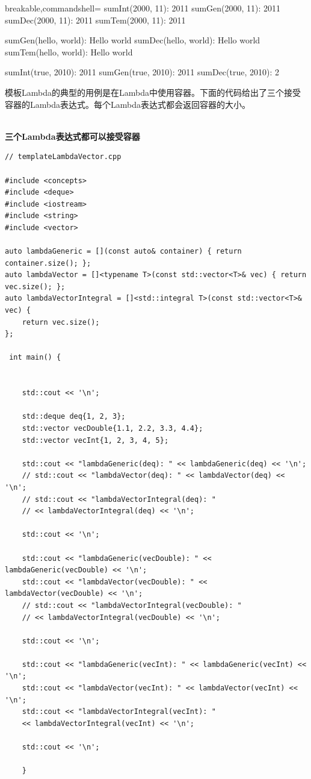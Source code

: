 \begin{tcblisting}{breakable,commandshell={}}
sumInt(2000, 11): 2011
sumGen(2000, 11): 2011
sumDec(2000, 11): 2011
sumTem(2000, 11): 2011

sumGen(hello, world): Hello world
sumDec(hello, world): Hello world
sumTem(hello, world): Hello world

sumInt(true, 2010): 2011
sumGen(true, 2010): 2011
sumDec(true, 2010): 2
\end{tcblisting}

模板Lambda的典型的用例是在Lambda中使用容器。下面的代码给出了三个接受容器的Lambda表达式。每个Lambda表达式都会返回容器的大小。

\hspace*{\fill} \\ %
\noindent
\textbf{三个Lambda表达式都可以接受容器}
\begin{lstlisting}[style=styleCXX]
// templateLambdaVector.cpp

#include <concepts>
#include <deque>
#include <iostream>
#include <string>
#include <vector>

auto lambdaGeneric = [](const auto& container) { return container.size(); };
auto lambdaVector = []<typename T>(const std::vector<T>& vec) { return vec.size(); };
auto lambdaVectorIntegral = []<std::integral T>(const std::vector<T>& vec) {
	return vec.size();
};

 int main() {
	
	
	std::cout << '\n';
	
	std::deque deq{1, 2, 3};
	std::vector vecDouble{1.1, 2.2, 3.3, 4.4};
	std::vector vecInt{1, 2, 3, 4, 5};
	
	std::cout << "lambdaGeneric(deq): " << lambdaGeneric(deq) << '\n';
	// std::cout << "lambdaVector(deq): " << lambdaVector(deq) << '\n';
	// std::cout << "lambdaVectorIntegral(deq): "
	// << lambdaVectorIntegral(deq) << '\n';
	
	std::cout << '\n';
	
	std::cout << "lambdaGeneric(vecDouble): " << lambdaGeneric(vecDouble) << '\n';
	std::cout << "lambdaVector(vecDouble): " << lambdaVector(vecDouble) << '\n';
	// std::cout << "lambdaVectorIntegral(vecDouble): "
	// << lambdaVectorIntegral(vecDouble) << '\n';
	
	std::cout << '\n';
	
	std::cout << "lambdaGeneric(vecInt): " << lambdaGeneric(vecInt) << '\n';
	std::cout << "lambdaVector(vecInt): " << lambdaVector(vecInt) << '\n';
	std::cout << "lambdaVectorIntegral(vecInt): "
	<< lambdaVectorIntegral(vecInt) << '\n';
	
	std::cout << '\n';
	
	}
\end{lstlisting}

